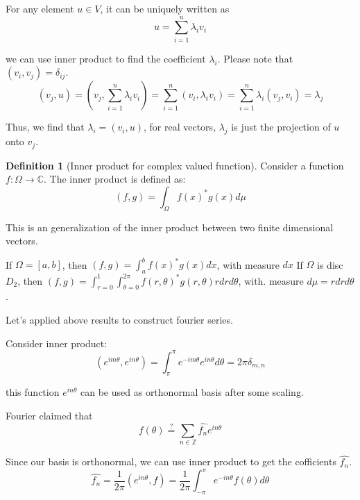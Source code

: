 \documentclass{article}
\theoremstyle{definition}
\newtheorem{definition}{Definition}[section]
\begin{document}
For any element $u\in V$,  it can be uniquely written as 
\begin{equation}
u=\sum_{i=1}^n \lambda_iv_i
\end{equation}

we can use inner product to find the coefficient $\lambda_i$. Please note that $(v_i,v_j)=\delta_{ij}$.
\begin{equation}
(v_j,u)=(v_j,\sum_{i=1}^n\lambda_i v_i)=\sum_{i=1}^n (v_i,\lambda_i v_i)=\sum_{i=1}^n \lambda_i(v_j,v_i)=\lambda_j
\end{equation}

Thus, we find that $\lambda_i=(v_i,u)$, for real vectors, $\lambda_j$ is just the projection of $u$ onto $v_j$.

\begin{definition}[Inner product for complex valued function]
Consider a function $f: \Omega \to \mathbb{C}$. The inner product is defined as:
\begin{equation}
(f,g)=\int_{\Omega}f(x)^*g(x)d\mu
\end{equation}
\end{definition}
This is an generalization of the inner product between two finite dimensional vectors. 

If $\Omega = [a,b]$, then $(f,g)=\int_a^b f(x)^*g(x)dx$, with measure $dx$
If $\Omega$ is disc $D_2$, then $(f,g)=\int_{r=0}^1\int_{\theta=0}^{2\pi}f(r,\theta)^*g(r,\theta)rdrd\theta$, with. measure $d\mu=rdrd\theta$.

Let's applied above results to construct fourier series.

Consider inner product:
\begin{equation}
(e^{im\theta},e^{in\theta})=\int_{\pi}^{\pi}e^{-im\theta}e^{in\theta}d\theta=2\pi \delta_{m,n}
\end{equation}

this function $e^{in\theta}$ can be used as orthonormal basis after some scaling.

Fourier claimed that 
\begin{equation}
f(\theta)\stackrel{?}{=}\sum_{n \in \mathbb{Z}}\hat{f_n}e^{in\theta}
\end{equation}


Since our basis is orthonormal, we can use inner product to get the cofficients $\hat{f_n}$.
\begin{equation}
\hat{f_n}=\frac{1}{2\pi}(e^{in\theta},f)=\frac{1}{2\pi}\int_{-\pi}^{\pi}e^{-in\theta}f(\theta)d\theta
\end{equation}
\end{document}
